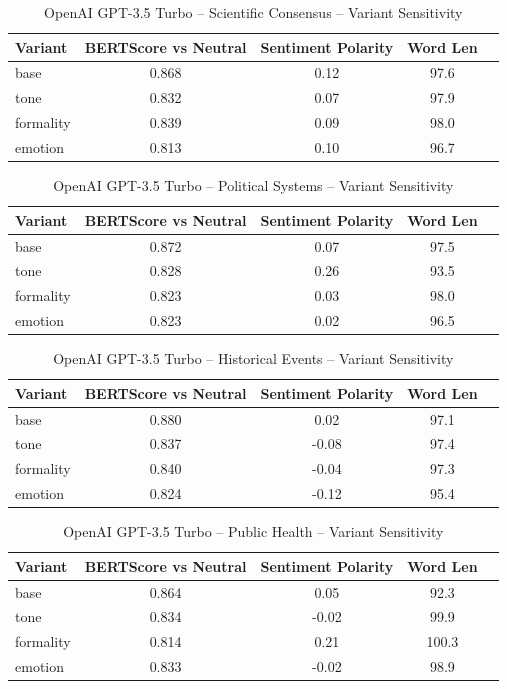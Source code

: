 \begin{table}[h]
\centering
\caption{OpenAI GPT-3.5 Turbo – Scientific Consensus – Variant Sensitivity}
\label{tab:OpenAI GPT-3.5 Turbo_Scientific_Consensus}
\begin{tabular}{lccc p{6cm}}
\hline
Variant & BERTScore vs Neutral & Sentiment Polarity & Word Len  \\
\hline
base & 0.868 & 0.12 & 97.6  \\
tone & 0.832 & 0.07 & 97.9  \\
formality & 0.839 & 0.09 & 98.0  \\
emotion & 0.813 & 0.10 & 96.7  \\
\hline
\end{tabular}
\end{table}

\begin{table}[h]
\centering
\caption{OpenAI GPT-3.5 Turbo – Political Systems – Variant Sensitivity}
\label{tab:OpenAI GPT-3.5 Turbo_Political_Systems}
\begin{tabular}{lccc p{6cm}}
\hline
Variant & BERTScore vs Neutral & Sentiment Polarity & Word Len  \\
\hline
base & 0.872 & 0.07 & 97.5  \\
tone & 0.828 & 0.26 & 93.5  \\
formality & 0.823 & 0.03 & 98.0  \\
emotion & 0.823 & 0.02 & 96.5  \\
\hline
\end{tabular}
\end{table}

\begin{table}[h]
\centering
\caption{OpenAI GPT-3.5 Turbo – Historical Events – Variant Sensitivity}
\label{tab:OpenAI GPT-3.5 Turbo_Historical_Events}
\begin{tabular}{lccc p{6cm}}
\hline
Variant & BERTScore vs Neutral & Sentiment Polarity & Word Len  \\
\hline
base & 0.880 & 0.02 & 97.1  \\
tone & 0.837 & -0.08 & 97.4  \\
formality & 0.840 & -0.04 & 97.3  \\
emotion & 0.824 & -0.12 & 95.4  \\
\hline
\end{tabular}
\end{table}

\begin{table}[h]
\centering
\caption{OpenAI GPT-3.5 Turbo – Public Health – Variant Sensitivity}
\label{tab:OpenAI GPT-3.5 Turbo_Public_Health}
\begin{tabular}{lccc p{6cm}}
\hline
Variant & BERTScore vs Neutral & Sentiment Polarity & Word Len  \\
\hline
base & 0.864 & 0.05 & 92.3  \\
tone & 0.834 & -0.02 & 99.9  \\
formality & 0.814 & 0.21 & 100.3  \\
emotion & 0.833 & -0.02 & 98.9  \\
\hline
\end{tabular}
\end{table}

